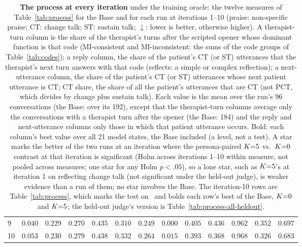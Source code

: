 \begin{table}[t]
\begin{tabular}{@{}lrrrrrrrrrrrr@{}}
9 & $0.040$ & $0.229$\rlap{$^{*}$} & $0.270$ & $0.435$\rlap{$^{*}$} & $0.310$ & $0.249$\rlap{$^{*}$} & $\mathbf{0.000}$\rlap{$^{*}$} & $0.405$ & $\mathbf{0.436}$\rlap{$^{*}$} & $0.962$\rlap{$^{*}$} & $\mathbf{0.352}$\rlap{$^{*}$} & $\mathbf{0.697}$\rlap{$^{*}$}\\
10 & $0.053$\rlap{$^{*}$} & $\mathbf{0.230}$\rlap{$^{*}$} & $0.279$ & $\mathbf{0.438}$\rlap{$^{*}$} & $0.332$\rlap{$^{*}$} & $\mathbf{0.264}$\rlap{$^{*}$} & $0.015$\rlap{$^{*}$} & $0.393$ & $0.368$ & $\mathbf{0.968}$\rlap{$^{*}$} & $0.326$ & $0.683$\rlap{$^{*}$}\\
\bottomrule
\end{tabular}
\caption{\textbf{The process at every iteration} under the training oracle: the twelve measures of
Table~\ref{tab:process} for the Base and for each run at iterations 1--10 (praise: non-specific
praise; CT: change talk; ST: sustain talk; $\downarrow$: lower is better, otherwise higher). A
therapist-turn column is the share of the therapist's turns after the scripted opener whose
dominant function is that code (MI-consistent and MI-inconsistent: the sums of the code groups of
Table~\ref{tab:codes}); a reply column, the share of the patient's CT (or ST) utterances that the
therapist's next turn answers with that code (reflects: a simple or complex reflection); a
next-utterance column, the share of the patient's CT (or ST) utterances whose next patient
utterance is CT; CT share, the share of all the patient's utterances that are CT (not PCT, which
divides by change plus sustain talk). Each value is the mean over the run's 96 conversations (the
Base: over its 192), except that the therapist-turn columns average only the conversations with a
therapist turn after the opener (the Base: 184) and the reply and next-utterance columns only those
in which that patient utterance occurs. Bold: each column's best value over all 21 model states,
the Base included (a level, not a test). A star marks the better of the two runs at an iteration
where the persona-paired $K{=}5$ vs.\ $K{=}0$ contrast at that iteration is significant (Holm across
iterations 1--10 within measure, not pooled across measures; one star for any Holm $p<.05$), so a
lone star, such as $K{=}5$'s at iteration 1 on reflecting change talk (not significant under the
held-out judge), is weaker evidence than a run of them; no star involves the Base. The
iteration-10 rows are Table~\ref{tab:process}, which marks the test on \dz\ and bolds each row's
best of the Base, $K{=}0$ and $K{=}5$; the held-out judge's version is Table~\ref{tab:process-all-heldout}.}
\label{tab:process-all}
\end{table}

